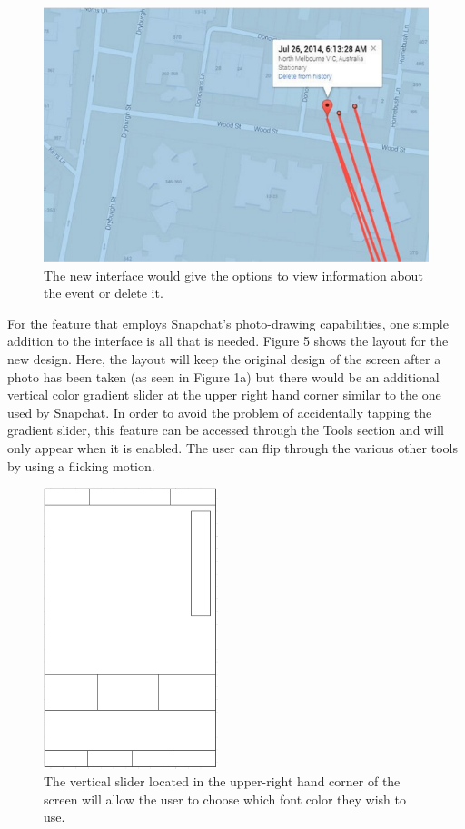 \documentclass[11pt]{article}
\begin{document}
\pagebreak

\begin{figure}[ht]
\centering
\includegraphics[width=5in]{images/google_maps_tracking_with_info.png}
\caption{The new interface would give the options to view information about the event or delete it.}
\label{google_tracking}
\end{figure}

   \indent For the feature that employs Snapchat's photo-drawing capabilities, one simple addition to the interface is all that is needed. Figure 5 shows the layout for the new design. Here, the layout will keep the original design of the screen after a photo has been taken (as seen in Figure 1a) but there would be an additional vertical color gradient slider at the upper right hand corner similar to the one used by Snapchat. In order to avoid the problem of accidentally tapping the gradient slider, this feature can be accessed through the Tools section and will only appear when it is enabled. The user can flip through the various other tools by using a flicking motion. 
      
\begin{figure}[ht]
\centering
\includegraphics[width=2in]{images/wireframe.png}
\caption{The vertical slider located in the upper-right hand corner of the screen will allow the user to choose which font color they wish to use.}
\label{wireframe}
\end{figure}
\end{document}
